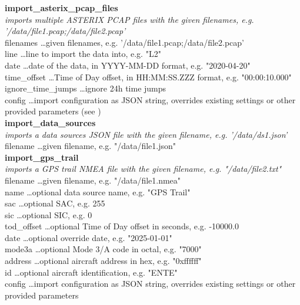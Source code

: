 \textbf{import\_asterix\_pcap\_files} \\
\textit{imports multiple ASTERIX PCAP files with the given filenames, e.g. '/data/file1.pcap;/data/file2.pcap'} \\
filenames \dots given filenames, e.g. '/data/file1.pcap;/data/file2.pcap' \\
line \dots line to import the data into, e.g. "L2" \\
date \dots date of the data, in YYYY-MM-DD format, e.g. "2020-04-20" \\
time\_offset \dots Time of Day offset, in HH:MM:SS.ZZZ format, e.g. "00:00:10.000" \\
ignore\_time\_jumps \dots ignore 24h time jumps \\
config \dots import configuration as JSON string, overrides existing settings or other provided parameters (see ) \\

\textbf{import\_data\_sources} \\
\textit{imports a data sources JSON file with the given filename, e.g. '/data/ds1.json'} \\
filename \dots given filename, e.g. "/data/file1.json" \\

\textbf{import\_gps\_trail} \\
\textit{imports a GPS trail NMEA file with the given filename, e.g. "/data/file2.txt"} \\
filename \dots given filename, e.g. "/data/file1.nmea" \\
name \dots optional data source name, e.g. "GPS Trail" \\
sac \dots optional SAC, e.g. 255 \\
sic \dots optional SIC, e.g. 0 \\
tod\_offset \dots optional Time of Day offset in seconds, e.g. -10000.0 \\
date \dots optional override date, e.g. "2025-01-01" \\
mode3a \dots optional Mode 3/A code in octal, e.g. "7000" \\
address \dots optional aircraft address in hex, e.g. "0xffffff" \\
id \dots optional aircraft identification, e.g. "ENTE" \\
config \dots import configuration as JSON string, overrides existing settings or other provided parameters \\

